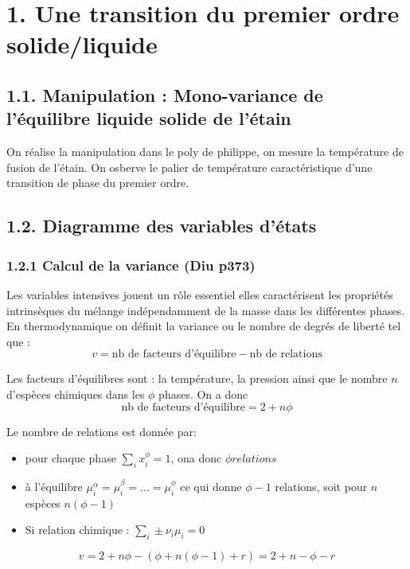 \documentclass[french, a4paper, 10pt, twocolumn, landscape]{article}
\begin{document}
\section*{1. Une transition du premier ordre solide/liquide}

\subsection*{1.1. Manipulation : Mono-variance de l'équilibre liquide solide de l'étain}

On réalise la manipulation dans le poly de philippe, on mesure la température de fusion de l'étain.
On osberve le palier de température caractéristique d'une transition de phase du premier ordre. 

\subsection*{1.2. Diagramme des variables d'états}

\subsubsection*{1.2.1 Calcul de la variance (Diu p373)}

Les variables intensives jouent un rôle essentiel elles caractérisent les propriétés intrinsèques du mélange indépendamment de la masse dans les différentes phases. En thermodynamique on définit la variance ou le nombre de degrés de liberté tel que : 
\begin{equation}
  v = \text{nb de facteurs d'équilibre} - \text{nb de relations}
\end{equation}

Les facteurs d'équilibres sont : la température, la pression ainsi que le nombre $n$ d'espèces chimiques dans les $\phi$ phases. On a donc $$\text{nb de facteurs d'équilibre} = 2+n\phi$$

Le nombre de relations est donnée par: 
\begin{itemize}
  \item pour chaque phase $\sum_i x_i^\phi =1$, ona donc $\phi relations$
  \item à l'équilibre $\mu_i^{\alpha}=\mu_i^\beta=...=\mu_i^\phi$ ce qui donne $\phi-1$ relations, soit pour $n$ espèces $n(\phi-1)$
  \item Si relation chimique : $\sum_i\pm\nu_i\mu_i=0$
\end{itemize}

\begin{equation}
  v = 2+n\phi-(\phi+n(\phi-1)+r)= 2+n-\phi-r
\end{equation}
\end{document}
